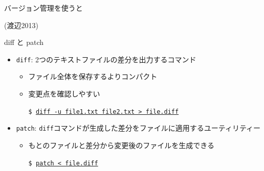 \documentclass[dvipdfmx]{beamer}
\begin{document}
\begin{frame}[t,fragile]{バージョン管理を使うと}
  \vspace*{-1.8em}
  \begin{center}
  \end{center}
  \vspace*{-2em}
  {\footnotesize (渡辺2013)}
\end{frame}

\begin{frame}[t,fragile]{diff と patch}
  \begin{itemize}
    \setlength{\itemsep}{1em}
  \item {\tt diff}: 2つのテキストファイルの差分を出力するコマンド
    \begin{itemize}
    \item ファイル全体を保存するよりコンパクト
    \item 変更点を確認しやすい
      
      {\tt \$ \underline{diff -u file1.txt file2.txt > file.diff}}
    \end{itemize}
  \item {\tt patch}: {\tt diff}コマンドが生成した差分をファイルに適用するユーティリティー
    \begin{itemize}
    \item もとのファイルと差分から変更後のファイルを生成できる

      {\tt \$ \underline{patch < file.diff}}
    \end{itemize}
  \end{itemize}
\end{frame}
\end{document}
